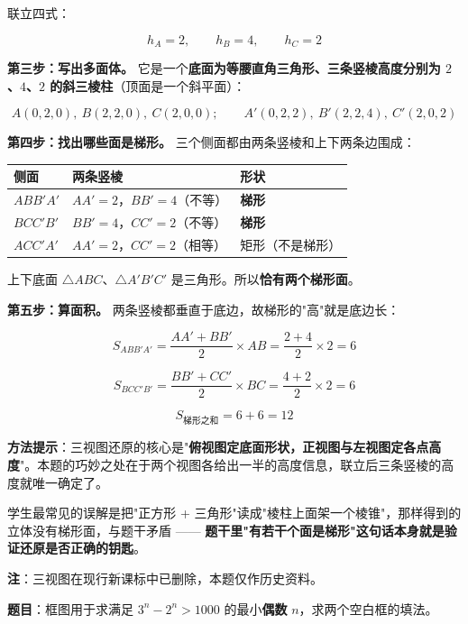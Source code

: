 联立四式：

\[h_A=2,\qquad h_B=4,\qquad h_C=2\]

\textbf{第三步：写出多面体。} 它是一个\textbf{底面为等腰直角三角形、三条竖棱高度分别为 $2$、$4$、$2$ 的斜三棱柱}（顶面是一个斜平面）：

\[A(0,2,0),\ B(2,2,0),\ C(2,0,0);\qquad A'(0,2,2),\ B'(2,2,4),\ C'(2,0,2)\]

\textbf{第四步：找出哪些面是梯形。} 三个侧面都由两条竖棱和上下两条边围成：

\begin{center}
\begin{tabular}{lll}
\toprule
侧面 & 两条竖棱 & 形状 \\
\midrule
$ABB'A'$ & $AA'=2$，$BB'=4$（不等） & \textbf{梯形} \\
$BCC'B'$ & $BB'=4$，$CC'=2$（不等） & \textbf{梯形} \\
$ACC'A'$ & $AA'=2$，$CC'=2$（相等） & 矩形（不是梯形） \\
\bottomrule
\end{tabular}
\end{center}

上下底面 $\triangle ABC$、$\triangle A'B'C'$ 是三角形。所以\textbf{恰有两个梯形面}。

\textbf{第五步：算面积。} 两条竖棱都垂直于底边，故梯形的"高"就是底边长：

\[S_{ABB'A'}=\frac{AA'+BB'}2\times AB=\frac{2+4}2\times2=6\]

\[S_{BCC'B'}=\frac{BB'+CC'}2\times BC=\frac{4+2}2\times2=6\]

\[S_{\text{梯形之和}}=6+6=12\]


\begin{gktip}
\textbf{方法提示}：三视图还原的核心是"\textbf{俯视图定底面形状，正视图与左视图定各点高度}"。本题的巧妙之处在于两个视图各给出一半的高度信息，联立后三条竖棱的高度就唯一确定了。

学生最常见的误解是把"正方形 + 三角形"读成"棱柱上面架一个棱锥"，那样得到的立体没有梯形面，与题干矛盾 —— \textbf{题干里"有若干个面是梯形"这句话本身就是验证还原是否正确的钥匙}。

\textbf{注}：三视图在现行新课标中已删除，本题仅作历史资料。
\end{gktip}

\par\medskip


\textbf{题目}：框图用于求满足 $3^{n}-2^{n}>1000$ 的最小\textbf{偶数} $n$，求两个空白框的填法。

